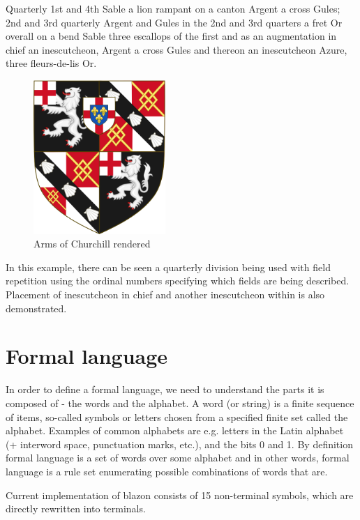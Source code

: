 \documentclass[12pt,a4paper]{article}
\let\oldsection\section
\renewcommand\section{\clearpage\oldsection}
\begin{document}
Quarterly 1st and 4th Sable a lion rampant on a canton Argent a cross Gules;
2nd and 3rd quarterly Argent and Gules in the 2nd and 3rd quarters a fret Or overall on a bend Sable three escallops of the first and as an augmentation in chief an inescutcheon, Argent a cross Gules and thereon an inescutcheon Azure, three fleurs-de-lis Or.
\begin{figure}[h]
	\centering
	\includegraphics[width=50mm]{img/512px-Arms_of_Winston_Churchill.png}
	\caption{Arms of Churchill rendered \cite{ArmsOfChurchillImg}}
	\label{armsOfChurchillImg}
\end{figure}

In this example, there can be seen a quarterly division being used with field repetition using the ordinal numbers specifying which fields are being described. Placement of inescutcheon in chief and another inescutcheon within is also demonstrated.

\section{Formal language}
In order to define a formal language, we need to understand the parts it is composed of - the words and the alphabet.
A word (or string) is a finite sequence of items, so-called symbols or letters chosen from a specified finite set called the alphabet.
Examples of common alphabets are e.g. letters in the Latin alphabet (+ interword space, punctuation marks, etc.), and the bits 0 and 1.\cite{ruohonen2009formal}
By definition formal language is a set of words over some alphabet and in other words, formal language is a rule set enumerating possible combinations of words that are.

Current implementation of blazon consists of 15 non-terminal symbols, which are directly rewritten into terminals.
\end{document}
